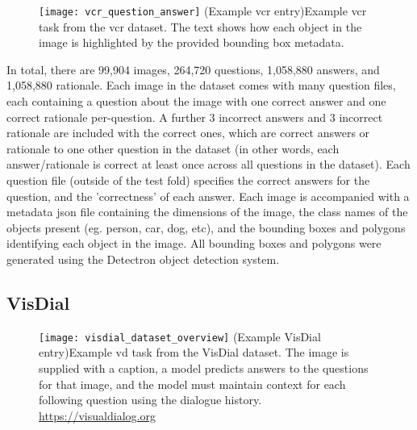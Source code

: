 \begin{figure}[htbp]
    \centering
    \texttt{[image: vcr\_question\_answer]}
    \captionsource(Example \acrshort{vcr} entry){Example \acrshort{vcr} task from the \acrshort{vcr} dataset. The text shows how each object in the image is highlighted by the provided bounding box metadata. \label{fig:vcr_question_answer}}{\citeauthor{zellers_recognition_2019}\cite{zellers_recognition_2019}}
\end{figure}

In total, there are 99,904 images, 264,720 questions, 1,058,880 answers, and 1,058,880 rationale.
Each image in the dataset comes with many question files, each containing a question about the image with one correct answer and one correct rationale per-question.
A further 3 incorrect answers and 3 incorrect rationale are included with the correct ones, which are correct answers or rationale to one other question in the dataset (in other words, each answer/rationale is correct at least once across all questions in the dataset).
Each question file (outside of the test fold) specifies the correct answers for the question, and the 'correctness' of each answer.
Each image is accompanied with a metadata json file containing the dimensions of the image, the class names of the objects present (eg. person, car, dog, etc), and the bounding boxes and polygons identifying each object in the image.
All bounding boxes and polygons were generated using the Detectron object detection system\cite{Detectron2018}.

\subsection{VisDial}
\label{subsec:visdial_dataset}

\begin{figure}[htbp]
    \centering
    \texttt{[image: visdial\_dataset\_overview]}
    \captionsource(Example VisDial entry){Example \gls{vd} task from the VisDial dataset. The image is supplied with a caption, a model predicts answers to the questions for that image, and the model must maintain context for each following question using the dialogue history. \label{fig:visdial_question_answer}}{\url{https://visualdialog.org}}
\end{figure}

